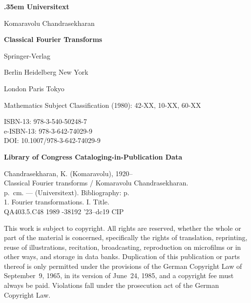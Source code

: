 
\begin{titlepage}
  \centering
  \vspace*{1.5\baselineskip}
  {\Large\bfseries\spaceskip .35em Universitext\par}
  \vfill
  {\large Komaravolu Chandrasekharan\par}
  \vfill
  {\LARGE\bfseries Classical Fourier Transforms\par}
  \vfill
  {\large Springer-Verlag\par}
  {\large Berlin Heidelberg New York\par}
  {\large London Paris Tokyo\par}
\end{titlepage}

\cleardoublepage
\thispagestyle{empty}
\noindent Mathematics Subject Classification (1980): 42-XX, 10-XX, 60-XX

\medskip\noindent ISBN-13: 978-3-540-50248-7\\
e-ISBN-13: 978-3-642-74029-9\\
DOI: 10.1007/978-3-642-74029-9

\medskip\noindent\textbf{Library of Congress Cataloging-in-Publication Data}

\noindent Chandrasekharan, K. (Komaravolu), 1920--\\
\noindent Classical Fourier transforms / Komaravolu Chandrasekharan.\\
\noindent\phantom{Chandrasekharan, K. (Komaravolu), 1920--}p.\ cm. --- (Universitext). Bibliography: p.\\
\noindent\phantom{Chandrasekharan, K. (Komaravolu), 1920--}1. Fourier transformations. I. Title.\\
\noindent\phantom{Chandrasekharan, K. (Komaravolu), 1920--}QA403.5.C48 1989 -38192 '23--dc19 \quad CIP

\medskip\noindent This work is subject to copyright. All rights are reserved, whether the whole or part
of the material is concerned, specifically the rights of translation, reprinting,
reuse of illustrations, recitation, broadcasting, reproduction on microfilms or in
other ways, and storage in data banks. Duplication of this publication or parts
thereof is only permitted under the provisions of the German Copyright Law of
September~9, 1965, in its version of June~24, 1985, and a copyright fee must always
be paid. Violations fall under the prosecution act of the German Copyright Law.


